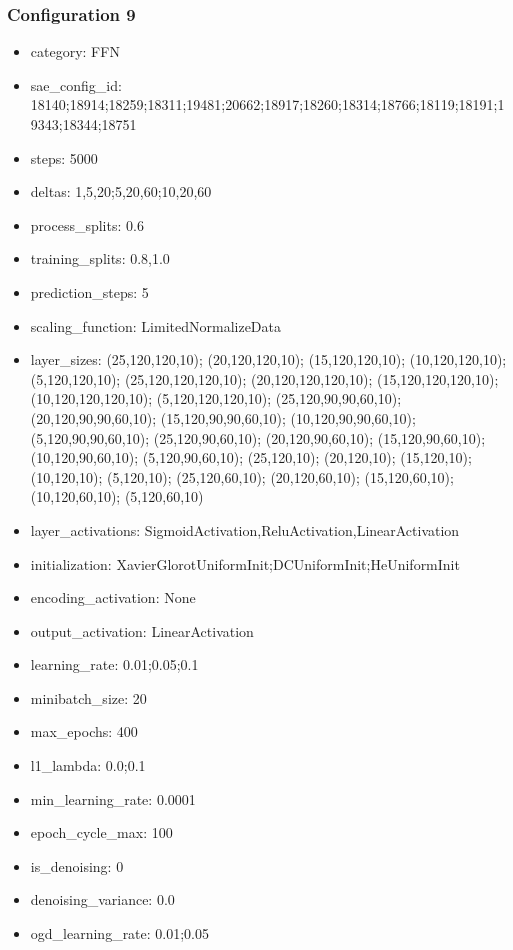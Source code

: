 \documentclass[a4paper,11pt,oneside]{article}
\theoremstyle{plain}
\theoremstyle{definition}
\begin{document}
	\subsubsection{Configuration 9}\label{config9}
	\begin{itemize}
		\item category: FFN
		\item sae\_config\_id: 18140;18914;18259;18311;19481;20662;18917;18260;18314;18766;18119;18191;19343;18344;18751
		\item steps: 5000
		\item deltas: 1,5,20;5,20,60;10,20,60
		\item process\_splits: 0.6
		\item training\_splits: 0.8,1.0
		\item prediction\_steps: 5
		\item scaling\_function: LimitedNormalizeData
		\item layer\_sizes: (25,120,120,10); (20,120,120,10); (15,120,120,10); (10,120,120,10); (5,120,120,10); (25,120,120,120,10); (20,120,120,120,10); (15,120,120,120,10); (10,120,120,120,10); (5,120,120,120,10); (25,120,90,90,60,10); (20,120,90,90,60,10); (15,120,90,90,60,10); (10,120,90,90,60,10); (5,120,90,90,60,10); (25,120,90,60,10); (20,120,90,60,10); (15,120,90,60,10); (10,120,90,60,10); (5,120,90,60,10); (25,120,10); (20,120,10); (15,120,10); (10,120,10); (5,120,10); (25,120,60,10); (20,120,60,10); (15,120,60,10); (10,120,60,10); (5,120,60,10)
		\item layer\_activations: SigmoidActivation,ReluActivation,LinearActivation
		\item initialization: XavierGlorotUniformInit;DCUniformInit;HeUniformInit
		\item encoding\_activation: None
		\item output\_activation: LinearActivation
		\item learning\_rate: 0.01;0.05;0.1
		\item minibatch\_size: 20
		\item max\_epochs: 400
		\item l1\_lambda: 0.0;0.1
		\item min\_learning\_rate: 0.0001
		\item epoch\_cycle\_max: 100
		\item is\_denoising: 0
		\item denoising\_variance: 0.0
		\item ogd\_learning\_rate: 0.01;0.05
	\end{itemize}
	
\end{document}
